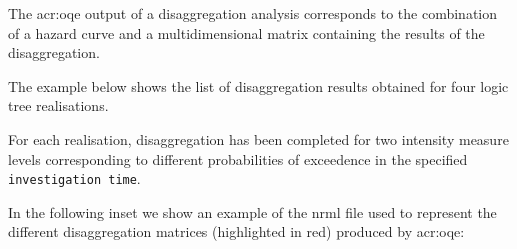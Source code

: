The \glsdesc{acr:oqe} output of a disaggregation analysis corresponds to the
combination of a hazard curve and a multidimensional matrix containing the
results of the disaggregation.

The example below shows the list of disaggregation results obtained for four
logic tree realisations.

For each realisation, disaggregation has been completed for two intensity
measure levels corresponding to different probabilities of exceedence in the
specified \texttt{investigation time}.



In the following inset we show an example of the nrml file used to represent
the different disaggregation matrices (highlighted in red) produced by
\gls{acr:oqe}:

